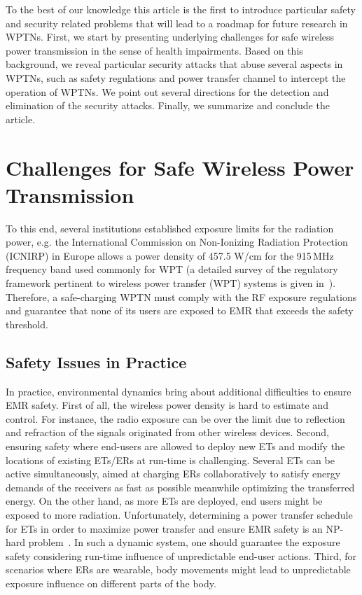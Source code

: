 \documentclass[journal,10pt,draftclsnofoot,onecolumn]{IEEEtran}
\begin{document}
To the best of our knowledge this article is the first to introduce particular safety and security related problems that will lead to a roadmap for future research in WPTNs. First, we start by presenting underlying challenges for safe wireless power transmission in the sense of health impairments. Based on this background, we reveal particular security attacks that abuse several aspects in WPTNs, such as safety regulations and power transfer channel to intercept the operation of WPTNs. We point out several directions for the detection and elimination of the security attacks. Finally, we summarize and conclude the article.

\section{Challenges for Safe Wireless Power Transmission}
\label{sec:Safety}



To this end, several institutions established exposure limits for the radiation power, e.g. the International Commission on Non-Ionizing Radiation Protection (ICNIRP) in Europe allows a power density of 457.5 W/cm for the 915\,MHz frequency band used commonly for WPT (a detailed survey of the regulatory framework pertinent to wireless power transfer (WPT) systems is given in~\cite{kalialakis2014wpt}). Therefore, a safe-charging WPTN must comply with the RF exposure regulations and guarantee that none of its users are exposed to EMR that exceeds the safety threshold. 

\subsection{Safety Issues in Practice}
\label{subsec:safety issues}

In practice, environmental dynamics bring about additional difficulties to ensure EMR safety. First of all, the wireless power density is hard to estimate and control. For instance, the radio exposure can be over the limit due to reflection and refraction of the signals originated from other wireless devices. Second, ensuring safety where end-users are allowed to deploy new ETs and modify the locations of existing ETs/ERs at run-time is challenging. Several ETs can be active simultaneously, aimed at charging ERs collaboratively to satisfy energy demands of the receivers as fast as possible meanwhile optimizing the transferred energy. On the other hand, as more ETs are deployed, end users might be exposed to more radiation. Unfortunately, determining a power transfer schedule for ETs in order to maximize power transfer and ensure EMR safety is an NP-hard problem~\cite{dai_infocom_2014}. In such a dynamic system, one should guarantee the exposure safety considering run-time influence of unpredictable end-user actions. Third, for scenarios where ERs are wearable, body movements might lead to unpredictable exposure influence on different parts of the body.
\end{document}
